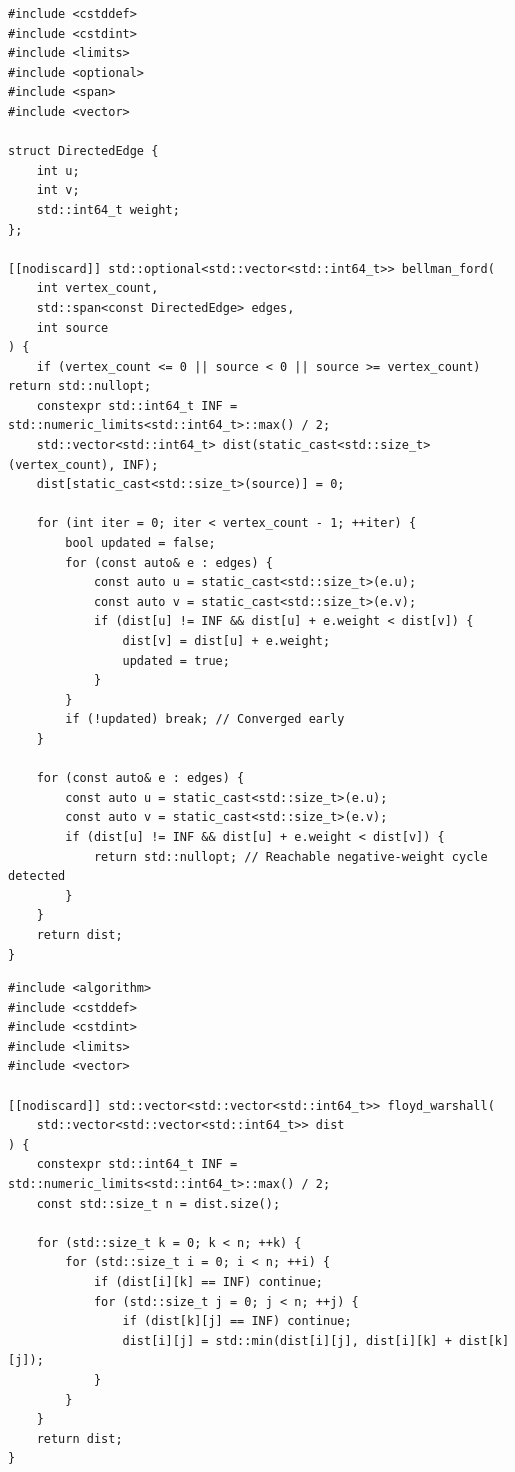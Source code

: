 \documentclass[11pt,a4paper]{article}
\theoremstyle{definition}
\begin{document}
\begin{lstlisting}[caption={Bellman-Ford single-source shortest paths with negative-cycle check}]
#include <cstddef>
#include <cstdint>
#include <limits>
#include <optional>
#include <span>
#include <vector>

struct DirectedEdge {
    int u;
    int v;
    std::int64_t weight;
};

[[nodiscard]] std::optional<std::vector<std::int64_t>> bellman_ford(
    int vertex_count,
    std::span<const DirectedEdge> edges,
    int source
) {
    if (vertex_count <= 0 || source < 0 || source >= vertex_count) return std::nullopt;
    constexpr std::int64_t INF = std::numeric_limits<std::int64_t>::max() / 2;
    std::vector<std::int64_t> dist(static_cast<std::size_t>(vertex_count), INF);
    dist[static_cast<std::size_t>(source)] = 0;

    for (int iter = 0; iter < vertex_count - 1; ++iter) {
        bool updated = false;
        for (const auto& e : edges) {
            const auto u = static_cast<std::size_t>(e.u);
            const auto v = static_cast<std::size_t>(e.v);
            if (dist[u] != INF && dist[u] + e.weight < dist[v]) {
                dist[v] = dist[u] + e.weight;
                updated = true;
            }
        }
        if (!updated) break; // Converged early
    }

    for (const auto& e : edges) {
        const auto u = static_cast<std::size_t>(e.u);
        const auto v = static_cast<std::size_t>(e.v);
        if (dist[u] != INF && dist[u] + e.weight < dist[v]) {
            return std::nullopt; // Reachable negative-weight cycle detected
        }
    }
    return dist;
}
\end{lstlisting}

\begin{lstlisting}[caption={Floyd-Warshall all-pairs shortest paths (k-outermost loop)}]
#include <algorithm>
#include <cstddef>
#include <cstdint>
#include <limits>
#include <vector>

[[nodiscard]] std::vector<std::vector<std::int64_t>> floyd_warshall(
    std::vector<std::vector<std::int64_t>> dist
) {
    constexpr std::int64_t INF = std::numeric_limits<std::int64_t>::max() / 2;
    const std::size_t n = dist.size();

    for (std::size_t k = 0; k < n; ++k) {
        for (std::size_t i = 0; i < n; ++i) {
            if (dist[i][k] == INF) continue;
            for (std::size_t j = 0; j < n; ++j) {
                if (dist[k][j] == INF) continue;
                dist[i][j] = std::min(dist[i][j], dist[i][k] + dist[k][j]);
            }
        }
    }
    return dist;
}
\end{lstlisting}
\end{document}
